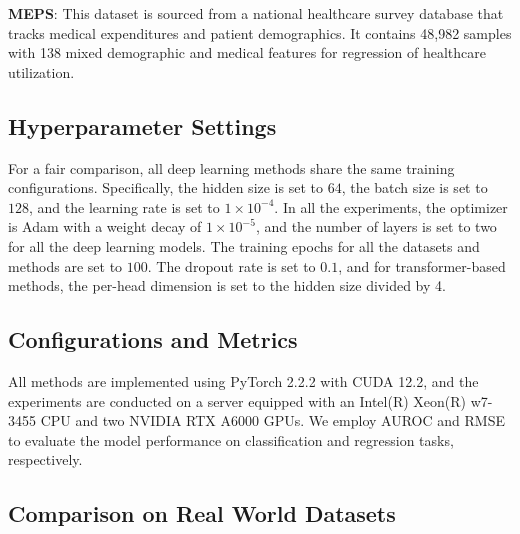 \documentclass[sigconf, nonacm]{acmart}
\newcommand{\done}[1]{{\color{black}#1}}
\newcommand{\sy}[1]{{\color{black}#1}}
\newcommand{\rlend}[1]{{\color{black}#1}}
\newcommand{\syend}[1]{{\color{black}#1}}
\newcommand{\syadd}[1]{{\color{black}#1}}
\newcommand{\syfix}[1]{{\color{black}#1}}
\newcommand{\vldb}[1]{{\color{red}#1}}
\begin{document}
\noindent \textbf{MEPS}: \vldb{This dataset is sourced from a national healthcare survey database that tracks medical expenditures and patient demographics. It contains 48,982 samples with 138 mixed demographic and medical features for regression of healthcare utilization.}

\syadd{\subsection{Hyperparameter Settings}
For a fair comparison, all deep learning methods share \syfix{the} same training configurations. Specifically, the hidden size is set to $64$, the batch size is set to $128$, and the learning rate is set to $1\times10^{-4}$. In all the experiments, the optimizer is Adam with a weight decay of $1\times10^{-5}$, and the number of layers is set to two for all the deep learning models. The training epochs for all the datasets and methods are set to $100$. The dropout rate is set to $0.1$, 
\syfix{and for transformer-based methods, the per-head dimension is set to the hidden size divided by 4\cite{r:attention}.}
}

\rlend{\subsection{Configurations and Metrics}}

All methods are implemented using PyTorch 2.2.2 with CUDA 12.2, and the experiments are conducted on a server equipped with an Intel(R) Xeon(R) w7-3455 CPU and two NVIDIA RTX A6000 GPUs.
\syend{We employ AUROC and RMSE to evaluate the model performance on classification and regression tasks, respectively. }



\subsection{Comparison on Real World Datasets}
\end{document}
